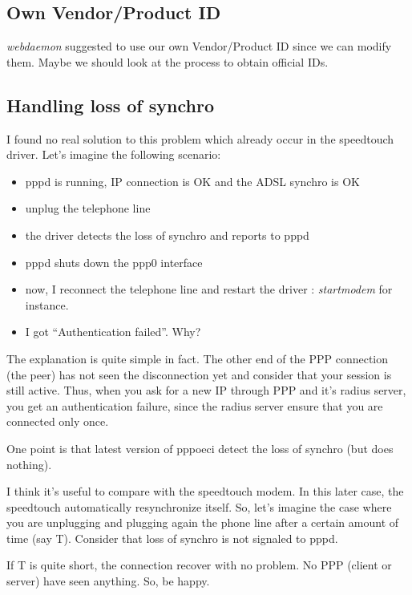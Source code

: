 \documentclass[a4paper,12pt]{article}
\begin{document}
\subsection{Own Vendor/Product ID}

\textit{webdaemon} suggested to use our own Vendor/Product ID since we
can modify them. Maybe we should look at the process to obtain
official IDs.

\subsection{Handling loss of synchro}

I found no real solution to this problem which already occur in the
speedtouch driver. Let's imagine the following scenario:

\begin{itemize}

\item pppd is running, IP connection is OK and the ADSL synchro is OK
\item unplug the telephone line
\item the driver detects the loss of synchro and reports to pppd
\item pppd shuts down the ppp0 interface
\item now, I reconnect the telephone line and restart the driver : \textit{startmodem} for instance.
\item I got ``Authentication failed''. Why?
\end{itemize}

The explanation is quite simple in fact. The other end of the PPP
connection (the peer) has not seen the disconnection yet and consider
that your session is still active. Thus, when you ask for a new IP
through PPP and it's radius server, you get an authentication failure,
since the radius server ensure that you are connected only once.

One point is that latest version of pppoeci detect the loss of synchro
(but does nothing).

I think it's useful to compare with the speedtouch modem. In this later case, the speedtouch automatically resynchronize itself. So, let's imagine the case where you are unplugging and plugging again the phone line after a certain amount of time (say T). Consider that loss of synchro is not signaled to pppd.

If T is quite short, the connection recover with no problem. No PPP (client or server) have seen anything. So, be happy.
\end{document}
